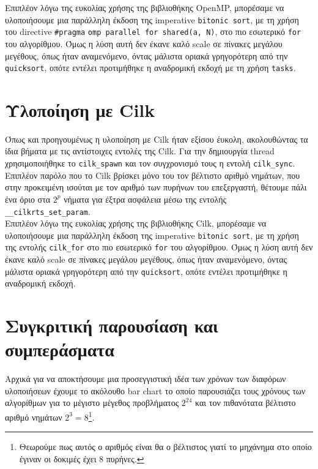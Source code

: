 \documentclass[11pt,a4paper,titlepage]{article}
\begin{document}
		Επιπλέον λόγω της ευκολίας χρήσης της βιβλιοθήκης OpenMP, μπορέσαμε να υλοποιήσουμε μια παράλληλη έκδοση της imperative \verb|bitonic sort|, με τη χρήση του directive		\verb|#pragma|	\verb|omp parallel for shared(a, N)|, στο πιο εσωτερικό \verb|for| του αλγορίθμου. Όμως η λύση αυτή δεν έκανε καλό scale σε πίνακες μεγάλου μεγέθους, όπως ήταν αναμενόμενο, όντας μάλιστα οριακά γρηγορότερη από την \verb|quicksort|, οπότε εντέλει προτιμήθηκε η αναδρομική εκδοχή με τη χρήση \verb|tasks|.
		
	\section{Υλοποίηση με Cilk}
		Όπως και προηγουμένως η υλοποίηση με Cilk ήταν εξίσου έυκολη, ακολουθώντας τα ίδια βήματα με τις αντίστοιχες εντολές της Cilk. Για την δημιουργία thread χρησιμοποιήθηκε το \verb|cilk_spawn| και τον συγχρονισμό τους η εντολή \verb|cilk_sync|. Επιπλέον παρόλο που το Cilk βρίσκει μόνο του τον βέλτιστο αριθμό νημάτων, που στην προκειμένη ισούται με τον αριθμό των πυρήνων του επεξεργαστή, θέτουμε πάλι ένα όριο στα $2^p$ νήματα για έξτρα ασφάλεια μέσω της εντολής \verb|__cilkrts_set_param|.\\
		
		Επιπλέον λόγω της ευκολίας χρήσης της βιβλιοθήκης Cilk, μπορέσαμε να υλοποιήσουμε μια παράλληλη έκδοση της imperative \verb|bitonic sort|, με τη χρήση της εντολής \verb|cilk_for| στο πιο εσωτερικό \verb|for| του αλγορίθμου. Όμως η λύση αυτή δεν έκανε καλό scale σε πίνακες μεγάλου μεγέθους, όπως ήταν αναμενόμενο, όντας μάλιστα οριακά γρηγορότερη από την \verb|quicksort|, οπότε εντέλει προτιμήθηκε η αναδρομική εκδοχή.

	\section{Συγκριτική παρουσίαση και συμπεράσματα}
		Αρχικά για να αποκτήσουμε μια προσεγγιστική ιδέα των χρόνων των διαφόρων υλοποιήσεων έχουμε το ακόλουθο bar chart το οποίο παρουσιάζει τους χρόνους των αλγορίθμων για το μέγιστο μέγεθος προβλήματος $2^{24}$ και τον πιθανότατα βέλτιστο αριθμό νημάτων $2^3=8$\footnote{Θεωρούμε πως αυτός ο αριθμός είναι θα ο βέλτιστος γιατί το μηχάνημα στο οποίο έγιναν οι δοκιμές έχει 8 πυρήνες.}.\\
		
\end{document}
